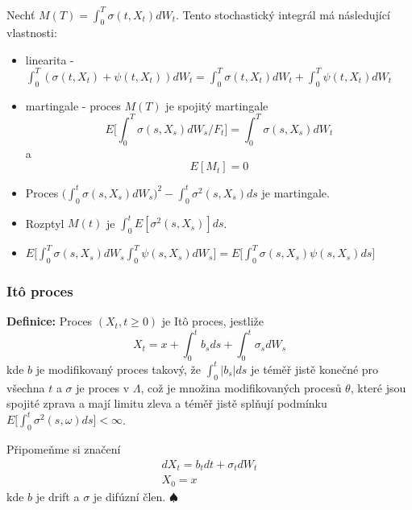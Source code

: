 \documentclass[a4paper]{book}
\begin{document}
Nechť $M(T) = \int_0^T \sigma(t, X_t)dW_t$. Tento stochastický integrál má následující vlastnosti:
\begin{itemize}
\item linearita - $\int_0^T (\sigma(t, X_t) + \psi(t, X_t))dW_t = \int_0^T \sigma(t, X_t)d W_t + \int_0^T \psi(t, X_t)d W_t$
\item martingale - proces $M(T)$ je spojitý martingale
\begin{equation*}
E\Big[ \int_0^T \sigma(s, X_s)d W_s / F_t \Big] = \int_0^T \sigma(s, X_s)d W_t
\end{equation*}
a
\begin{equation*}
E[M_t] = 0
\end{equation*}
\item Proces $\Big( \int_0^t \sigma(s, X_s)d W_s \Big)^2 - \int_0^t \sigma^2(s, X_s)ds$ je martingale.
\item Rozptyl $M(t)$ je $\int_0^t E[\sigma^2(s, X_s)]ds$.
\item $E \Big[ \int_0^T \sigma(s, X_s) dW_s \int_0^T \psi(s, X_s)d W_s \Big] = E \Big[\int_0^T \sigma(s, X_s) \psi(s,X_s) ds \Big]$
\end{itemize}

\subsubsection{It\^o proces}

\noindent \textbf{Definice:} Proces $(X_t, t \ge 0)$ je It\^o proces, jestliže
\begin{equation*}
X_t = x + \int_0^t b_s ds + \int_0^t \sigma_s dW_s
\end{equation*}
kde $b$ je modifikovaný proces takový, že $\int_0^t |b_s|ds$ je téměř jistě konečné pro všechna $t$ a $\sigma$ je proces v $\Lambda$, což je množina modifikovaných procesů $\theta$, které jsou spojité zprava a mají limitu zleva a téměř jistě splňují podmínku $E\Big[ \int_0^t \sigma^2(s, \omega)ds \Big] < \infty$.

Připomeňme si značení
\begin{gather*}
d X_t = b_t dt + \sigma_t dW_t \\
X_0 = x
\end{gather*}
kde $b$ je drift a $\sigma$ je difúzní člen. $\spadesuit$\\
\end{document}
